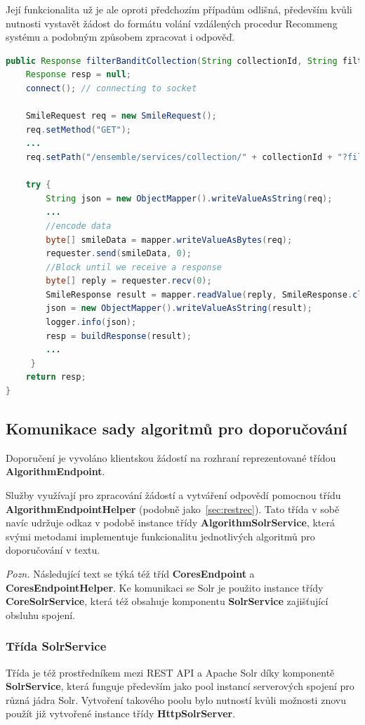 \documentclass[thesis=M,czech]{FITthesis}[2014/05/07]
\begin{document}
Její funkcionalita už je ale oproti předchozím případům odlišná, především kvůli nutnosti vystavět žádost do formátu volání vzdálených procedur Recommeng systému a podobným způsobem zpracovat i odpověď.

\begin{lstlisting}[language=java]
public Response filterBanditCollection(String collectionId, String filter) {
    Response resp = null;
    connect(); // connecting to socket

    SmileRequest req = new SmileRequest();
    req.setMethod("GET");
	...
    req.setPath("/ensemble/services/collection/" + collectionId + "?filter=" + filter);

    try {
        String json = new ObjectMapper().writeValueAsString(req);
		...
        //encode data
        byte[] smileData = mapper.writeValueAsBytes(req);
        requester.send(smileData, 0);
        //Block until we receive a response
        byte[] reply = requester.recv(0);
        SmileResponse result = mapper.readValue(reply, SmileResponse.class);
        json = new ObjectMapper().writeValueAsString(result);
        logger.info(json);
        resp = buildResponse(result);            
     	...
     }
    return resp;        
}    
\end{lstlisting}

\subsection{Komunikace sady algoritmů pro doporučování}
\label{sec:algcom}
Doporučení je vyvoláno klientskou žádostí na rozhraní reprezentované třídou \textbf{AlgorithmEndpoint}. 

Služby využívají pro zpracování žádostí a vytváření odpovědí pomocnou třídu \textbf{AlgorithmEndpointHelper} (podobně jako~\ref{sec:restrec}). Tato třída v sobě navíc udržuje odkaz v podobě instance třídy \textbf{AlgorithmSolrService}, která svými metodami implementuje funkcionalitu jednotlivých algoritmů pro doporučování v textu.

\emph{Pozn.} Následující text se týká též tříd \textbf{CoresEndpoint} a \textbf{CoresEndpointHelper}. Ke komunikaci se Solr je použito instance třídy \textbf{CoreSolrService}, která též obsahuje komponentu \textbf{SolrService} zajišťující obsluhu spojení.

\subsubsection{Třída SolrService}
Třída je též prostředníkem mezi REST API a Apache Solr díky komponentě \textbf{SolrService}, která funguje především jako pool instancí serverových spojení pro různá jádra Solr. Vytvoření takového poolu bylo nutností kvůli možnosti znovu použít již vytvořené instance třídy \textbf{HttpSolrServer}.
\end{document}
